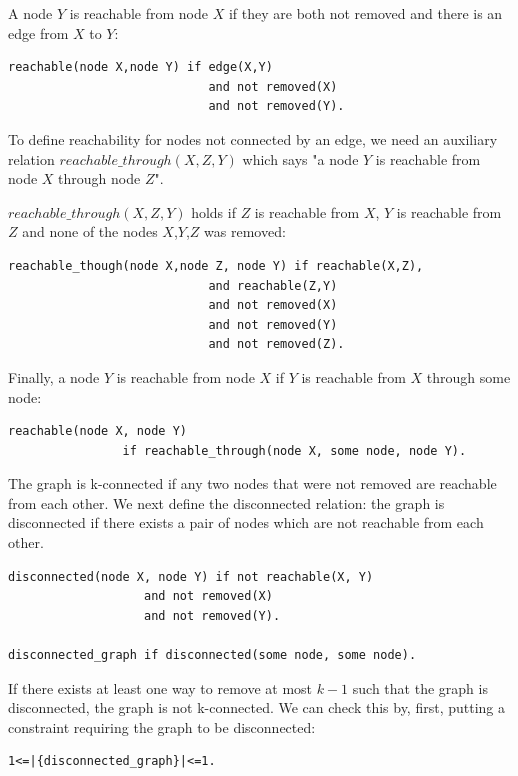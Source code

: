 \documentclass[a4paper,10pt]{article}
\begin{document}
\medskip\noindent
A node $Y$ is reachable from node $X$ if they are both not removed and there is an edge from $X$ to $Y$:
\begin{verbatim}
reachable(node X,node Y) if edge(X,Y) 
                            and not removed(X) 
                            and not removed(Y). 
\end{verbatim}

\medskip\noindent

To define reachability for nodes not connected by an edge, we need an auxiliary relation $reachable\_through(X,Z,Y)$ which says
"a node $Y$ is reachable from node $X$ through node $Z$".

$reachable\_through(X,Z,Y)$ holds if $Z$ is reachable from $X$, $Y$ is reachable from $Z$ and none of the nodes $X$,$Y$,$Z$ was removed:

\begin{verbatim}
reachable_though(node X,node Z, node Y) if reachable(X,Z),              
                            and reachable(Z,Y) 
                            and not removed(X) 
                            and not removed(Y) 
                            and not removed(Z).
\end{verbatim}

Finally, a node $Y$ is reachable from node $X$ if $Y$ is reachable from $X$ through some node:

\begin{verbatim}
reachable(node X, node Y)
                if reachable_through(node X, some node, node Y).
\end{verbatim} 


\medskip\noindent
The graph is k-connected if any two nodes  that were not removed are reachable from each other.
We next define the disconnected relation: the graph is disconnected if there exists a pair of nodes which are not reachable from
each other.

\begin{verbatim}
disconnected(node X, node Y) if not reachable(X, Y) 
                   and not removed(X)
                   and not removed(Y).                

disconnected_graph if disconnected(some node, some node).   
\end{verbatim}
If there exists at least one way to remove at most $k-1$ such that the graph is disconnected, the graph is not k-connected.
We can check this by, first, putting a constraint requiring the graph to be disconnected:

\begin{verbatim}
1<=|{disconnected_graph}|<=1.
\end{verbatim}
\end{document}
